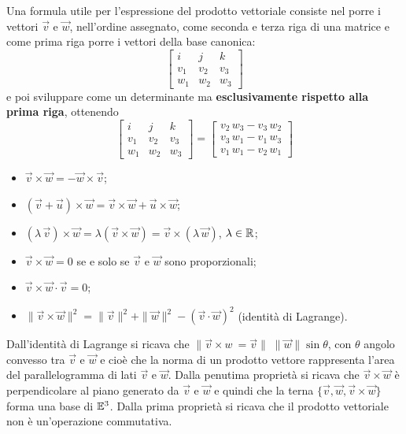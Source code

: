 Una formula utile per l'espressione del prodotto vettoriale consiste nel porre 
i vettori
$\vec v$ e $\vec w$, nell'ordine assegnato, come seconda e terza riga di una 
matrice
e come prima riga porre i vettori della base canonica:
\[\begin{bmatrix}
  i& j & k\\
  v_1 & v_2 & v_3\\
  w_1 & w_2 &w_3
\end{bmatrix}\]
e poi sviluppare come un determinante ma \textbf{esclusivamente rispetto alla
prima riga}, ottenendo
\[\begin{bmatrix}
    i& j & k\\
    v_1 & v_2 & v_3\\
    w_1 & w_2 &w_3
  \end{bmatrix} = 
  \begin{bmatrix} 
        v_2\,w_3 - v_3\,w_2 \\
        v_3\,w_1 - v_1\,w_3 \\
        v_1\,w_1-v_2\,w_1
  \end{bmatrix}
\]
\begin{proprieta}
  \begin{itemize}
    \item $\vec v\times \vec w = - \vec w\times \vec v$;
    \item $(\vec v+\vec u)\times \vec w = \vec v\times \vec w + \vec 
u\times\vec w$;
    \item $(\lambda\, \vec v)\times \vec w = 
              \lambda (\vec v\times \vec w) = \vec v\times(\lambda\, \vec w)$, 
$\lambda\in\mathbb{R}^{}$;
    \item $\vec v\times \vec w = 0$ se e solo se $\vec v$ e $\vec w$ sono 
proporzionali;
    \item $\vec v\times \vec w \cdot \vec v = 0$;
    \item $\|\vec v\times\vec w\|^2 = \|\vec v\|^2+\|\vec w\|^2 - (\vec 
v\cdot\vec w)^2$ 
              (identità di Lagrange).
  \end{itemize}
\end{proprieta}
Dall'identità di Lagrange si ricava che $\|\vec v\times w\ = \vec v\|\;\|\vec 
w\| \sin\theta$, con
$\theta$ angolo convesso tra $\vec v$ e $\vec w$ e cioè che la norma di un 
prodotto vettore rappresenta l'area del parallelogramma di lati $\vec v$ e 
$\vec w$. Dalla penutima proprietà
si ricava che $\vec v\times \vec w$ è perpendicolare al piano generato da 
$\vec v$ e $\vec w$
e quindi che la terna $\{\vec v,\vec w,\vec v\times\vec w\}$ forma una base di 
$\mathbb{E}^{3}$.
Dalla prima proprietà si ricava che il prodotto vettoriale non è 
un'operazione commutativa.\\

